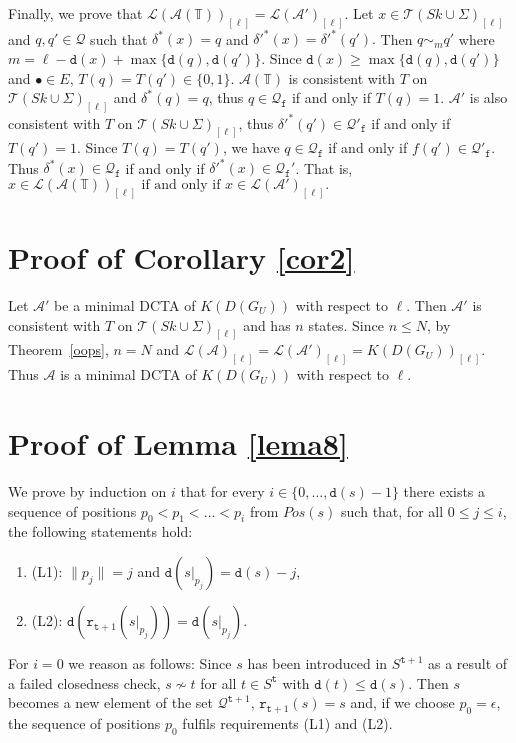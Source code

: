 \documentclass[preprint,12pt,english]{article}
\def\hole{\bullet}
\def\tr{\mathtt{r}}
\def\cA{\mathcal{A}}
\def\cL{\mathcal{L}}
\def\cT{\mathcal{T}}
\def\cQ{\mathcal{Q}}
\def\depth{\mathtt{d}}
\def\ty{\mathtt{t}}
\begin{document}
Finally, we prove that $\cL(\cA(\mathbb{T}))_{[\ell]}=\cL(\cA')_{[\ell]}$. Let $x\in \cT(Sk\cup\Sigma)_{[\ell]}$ and $q,q'\in \cQ$ such that $\delta^*(x)=q$ and $\delta'^*(x)=\delta'^*(q').$ Then $q\sim_m q'$ where $m=\ell-\depth(x)+\max\{\depth(q),\depth(q')\}.$ Since $\depth(x)\geq \max\{\depth(q),\depth(q')\}$ and $\hole\in E$, $T(q)=T(q')\in\{0,1\}.$  $\cA(\mathbb{T})$ is consistent with $T$ on $\cT(Sk\cup\Sigma)_{[\ell]}$ and $\delta^*(q)=q$, thus $q\in \cQ_{\mathtt{f}}$ if and only if $T(q)=1.$ $\cA'$ is also consistent with $T$ on $\cT(Sk\cup\Sigma)_{[\ell]}$, thus $\delta'^*(q')\in \cQ'_{\mathtt{f}}$ if and only if $T(q')=1.$ Since $T(q)=T(q')$, we have $q\in\cQ_{\mathtt{f}}$ if and only if $f(q')\in\cQ'_{\mathtt{f}}.$ Thus $\delta^*(x)\in\cQ_{\mathtt{f}}$ if and only if $\delta'^*(x)\in\cQ_{\mathtt{f}}'$. That is,
$x\in \cL(\cA(\mathbb{T}))_{[\ell]}\text{ if and only if }x\in \cL(\cA')_{[\ell]}.$
\section{Proof of Corollary \ref{cor2}}
Let $\cA'$ be a minimal DCTA of $K(D(G_U))$ with respect to $\ell$. Then $\cA'$ is consistent with  $T$ on $\cT(Sk\cup\Sigma)_{[\ell]}$ and has $n$ states. Since $n\leq N$, by Theorem~\ref{oops}, $n=N$ and $\cL(\cA)_{[\ell]}=\cL(\cA')_{[\ell]}=K(D(G_U))_{[\ell]}.$ Thus $\cA$ is a minimal DCTA of $K(D(G_U))$  with respect to $\ell$. 

\section{Proof of Lemma \ref{lema8}}
We prove by induction on $i$ that for every $i\in\{0,\ldots,\depth(s)-1\}$ there exists a sequence of positions $p_0<p_1<\ldots <p_i$ from $Pos(s)$ such that, for all $0\leq j\leq i$, the following statements hold:
\begin{enumerate}
\item[](L1): $\|p_j\|=j$ and $\depth(s|_{p_j})=\depth(s)-j$,  
\item[](L2): $\depth(\tr_{\ty+1}(s|_{p_j}))=\depth(s|_{p_j})$.
\end{enumerate}

For $i=0$ we reason as follows: Since $s$ has been introduced in $S^{\ty+1}$ as a result of a failed closedness check, $s\nsim t$ for all $t\in S^{\ty}$ with $\depth(t)\leq\depth(s).$ Then $s$ becomes a new element of the set $\cQ^{\ty+1}$, $\tr_{\ty+1}(s)=s$ and, if we choose $p_0=\epsilon$, the sequence of positions $p_0$ fulfils  requirements  (L1) and (L2). 
\end{document}
